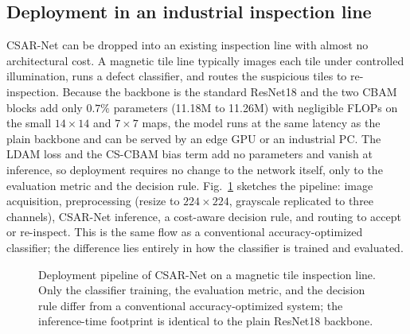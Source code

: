 \documentclass[a4paper,fleqn]{cas-sc}
\begin{document}
\begin{sloppypar}
	\subsection{Deployment in an industrial inspection line}
	\par{
		CSAR-Net can be dropped into an existing inspection line with almost no architectural cost. A magnetic tile line typically images each tile under controlled illumination, runs a defect classifier, and routes the suspicious tiles to re-inspection. Because the backbone is the standard ResNet18 and the two CBAM blocks add only $0.7\%$ parameters (11.18M to 11.26M) with negligible FLOPs on the small $14\times14$ and $7\times7$ maps, the model runs at the same latency as the plain backbone and can be served by an edge GPU or an industrial PC. The LDAM loss and the CS-CBAM bias term add no parameters and vanish at inference, so deployment requires no change to the network itself, only to the evaluation metric and the decision rule. Fig.~\ref{fig:pipeline} sketches the pipeline: image acquisition, preprocessing (resize to $224\times224$, grayscale replicated to three channels), CSAR-Net inference, a cost-aware decision rule, and routing to accept or re-inspect. This is the same flow as a conventional accuracy-optimized classifier; the difference lies entirely in how the classifier is trained and evaluated.
	}

	\begin{figure}[pos=htbp]
		\centering
		\caption{Deployment pipeline of CSAR-Net on a magnetic tile inspection line. Only the classifier training, the evaluation metric, and the decision rule differ from a conventional accuracy-optimized system; the inference-time footprint is identical to the plain ResNet18 backbone.}
		\label{fig:pipeline}
	\end{figure}


\end{sloppypar}
\end{document}

